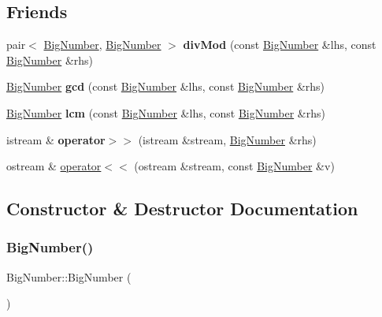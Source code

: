 \subsection*{Friends}
\begin{DoxyCompactItemize}
\item 
\mbox{\label{class_big_number_a87da99a4101d1571a6440b563de938b1}} 
pair$<$ \mbox{\hyperlink{class_big_number}{Big\+Number}}, \mbox{\hyperlink{class_big_number}{Big\+Number}} $>$ {\bfseries div\+Mod} (const \mbox{\hyperlink{class_big_number}{Big\+Number}} \&lhs, const \mbox{\hyperlink{class_big_number}{Big\+Number}} \&rhs)
\item 
\mbox{\label{class_big_number_af2651b66072a4c0b003ab6eee1c3c6c8}} 
\mbox{\hyperlink{class_big_number}{Big\+Number}} {\bfseries gcd} (const \mbox{\hyperlink{class_big_number}{Big\+Number}} \&lhs, const \mbox{\hyperlink{class_big_number}{Big\+Number}} \&rhs)
\item 
\mbox{\label{class_big_number_afc8d022d361de2618864f3eca83ab7a1}} 
\mbox{\hyperlink{class_big_number}{Big\+Number}} {\bfseries lcm} (const \mbox{\hyperlink{class_big_number}{Big\+Number}} \&lhs, const \mbox{\hyperlink{class_big_number}{Big\+Number}} \&rhs)
\item 
\mbox{\label{class_big_number_a805dbfd9e5a941a8f2ce3d82f48b4106}} 
istream \& {\bfseries operator$>$$>$} (istream \&stream, \mbox{\hyperlink{class_big_number}{Big\+Number}} \&rhs)
\item 
ostream \& \mbox{\hyperlink{class_big_number_a862a0b741309e4033e9eee7285b5dd67}{operator$<$$<$}} (ostream \&stream, const \mbox{\hyperlink{class_big_number}{Big\+Number}} \&v)
\end{DoxyCompactItemize}


\subsection{Constructor \& Destructor Documentation}
\mbox{\label{class_big_number_a0d12fbec476322042ba36e61e1b0db82}} 
\subsubsection{\texorpdfstring{Big\+Number()}{BigNumber()}\hspace{0.1cm}{\footnotesize\ttfamily [1/2]}}
{\footnotesize\ttfamily Big\+Number\+::\+Big\+Number (\begin{DoxyParamCaption}{ }\end{DoxyParamCaption})\hspace{0.3cm}{\ttfamily [inline]}}


